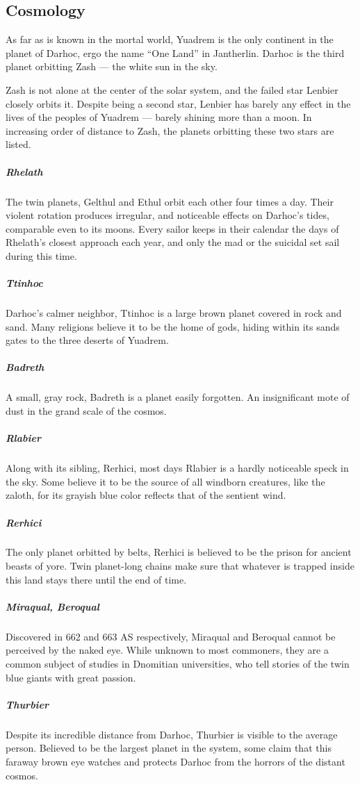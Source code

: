 \subsection*{Cosmology}
As far as is known in the mortal world, Yuadrem is the only continent in the planet of Darhoc, ergo the name ``One Land'' in Jantherlin.
Darhoc is the third planet orbitting Zash --- the white sun in the sky.

Zash is not alone at the center of the solar system, and the failed star Lenbier closely orbits it.
Despite being a second star, Lenbier has barely any effect in the lives of the peoples of Yuadrem --- barely shining more than a moon.
In increasing order of distance to Zash, the planets orbitting these two stars are listed.

\subparagraph{Rhelath} The twin planets, Gelthul and Ethul orbit each other four times a day.
Their violent rotation produces irregular, and noticeable effects on Darhoc's tides, comparable even to its moons.
Every sailor keeps in their calendar the days of Rhelath's closest approach each year, and only the mad or the suicidal set sail during this time.

\subparagraph{Ttinhoc} Darhoc's calmer neighbor, Ttinhoc is a large brown planet covered in rock and sand.
Many religions believe it to be the home of gods, hiding within its sands gates to the three deserts of Yuadrem.

\subparagraph{Badreth} A small, gray rock, Badreth is a planet easily forgotten.
An insignificant mote of dust in the grand scale of the cosmos.

\subparagraph{Rlabier} Along with its sibling, Rerhici, most days Rlabier is a hardly noticeable speck in the sky.
Some believe it to be the source of all windborn creatures, like the zaloth, for its grayish blue color reflects that of the sentient wind.

\subparagraph{Rerhici} The only planet orbitted by belts, Rerhici is believed to be the prison for ancient beasts of yore.
Twin planet-long chains make sure that whatever is trapped inside this land stays there until the end of time.

\subparagraph{Miraqual, Beroqual} Discovered in 662 and 663 AS respectively, Miraqual and Beroqual cannot be perceived by the naked eye.
While unknown to most commoners, they are a common subject of studies in Dnomitian universities, who tell stories of the twin blue giants with great passion.

\subparagraph{Thurbier} Despite its incredible distance from Darhoc, Thurbier is visible to the average person.
Believed to be the largest planet in the system, some claim that this faraway brown eye watches and protects Darhoc from the horrors of the distant cosmos.

